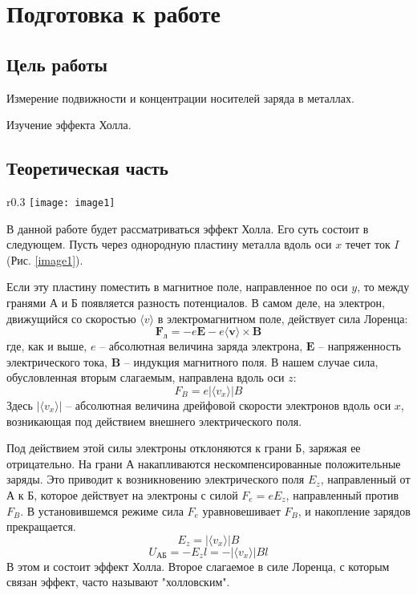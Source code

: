\documentclass{lab}
\newcommand{\ve}[1]{\boldsymbol{#1}}
\begin{document}


\section*{Подготовка к работе}

\subsection*{Цель работы}

Измерение подвижности и концентрации носителей заряда в металлах.

Изучение эффекта Холла.

\subsection*{Теоретическая часть}

\begin{wrapfigure}{r}{0.3\textwidth}
	\vspace{-1cm}
	\centering
	\texttt{[image: image1]}
	\vspace{-0.7cm}
	\caption{\footnotesize Образец с током в магнитном поле}
	\label{image1}
\end{wrapfigure}

В данной работе будет рассматриваться эффект Холла. Его суть состоит в следующем. Пусть через однородную
пластину металла вдоль оси $ x $ течет ток $ I $ (Рис. \ref{image1}).

Если эту пластину поместить в магнитное поле, направленное по оси $ y $, то между гранями А и Б появляется
разность потенциалов. В самом деле, на электрон, движущийся со скоростью $ \langle v \rangle $ в
электромагнитном поле, действует сила Лоренца:
\begin{equation}
\ve{F}_л = -e {\ve{E}} - e\langle{\ve{v}}\rangle \times {\ve{B}}
\end{equation}
где, как и выше, $ e $ -- абсолютная величина заряда электрона, $ \ve{E} $ -- напряженность электрического
тока, $ \ve{B} $ -- индукция магнитного поля. В нашем случае сила, обусловленная вторым слагаемым,
направлена вдоль оси $ z $:
\begin{equation}
F_B = e | \langle v_x \rangle | B
\end{equation}
Здесь $ | \langle v_x \rangle | $ -- абсолютная величина дрейфовой скорости электронов вдоль оси $ x $,
возникающая под действием внешнего электрического поля.

Под действием этой силы электроны отклоняются к грани Б, заряжая ее отрицательно.
На грани А накапливаются нескомпенсированные положительные заряды.
Это приводит к возникновению электрического поля $ E_z $, направленный от А к Б,
которое действует на электроны с силой $ F_e = eE_z $, направленный против $ F_B $.
В установившемся режиме сила $ F_e $ уравновешивает $ F_B $, и накопление зарядов прекращается.
$$ E_z = | \langle v_x \rangle | B $$
$$ U_{АБ} = -E_zl = -| \langle v_x \rangle |Bl $$
В этом и состоит эффект Холла. Второе слагаемое в силе Лоренца, с которым связан эффект, часто называют "холловским".
\end{document}
